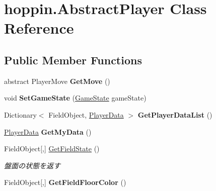 \hypertarget{classhoppin_1_1_abstract_player}{}\section{hoppin.\+Abstract\+Player Class Reference}
\label{classhoppin_1_1_abstract_player}
\subsection*{Public Member Functions}
\begin{DoxyCompactItemize}
\item 
abstract Player\+Move {\bfseries Get\+Move} ()\hypertarget{classhoppin_1_1_abstract_player_abd1e5ab01f3e4dfcb487432e19e28196}{}\label{classhoppin_1_1_abstract_player_abd1e5ab01f3e4dfcb487432e19e28196}

\item 
void {\bfseries Set\+Game\+State} (\hyperlink{classhoppin_1_1_game_system_1_1_game_state}{Game\+State} game\+State)\hypertarget{classhoppin_1_1_abstract_player_a832b3b3d17a2046d0a9c221684aabb36}{}\label{classhoppin_1_1_abstract_player_a832b3b3d17a2046d0a9c221684aabb36}

\item 
Dictionary$<$ Field\+Object, \hyperlink{classhoppin_1_1_game_system_1_1_player_data}{Player\+Data} $>$ {\bfseries Get\+Player\+Data\+List} ()\hypertarget{classhoppin_1_1_abstract_player_a5c27809c110d053e8a3e765350333bac}{}\label{classhoppin_1_1_abstract_player_a5c27809c110d053e8a3e765350333bac}

\item 
\hyperlink{classhoppin_1_1_game_system_1_1_player_data}{Player\+Data} {\bfseries Get\+My\+Data} ()\hypertarget{classhoppin_1_1_abstract_player_af95bb5c30ae4c8580fcc74931c7d074c}{}\label{classhoppin_1_1_abstract_player_af95bb5c30ae4c8580fcc74931c7d074c}

\item 
Field\+Object\mbox{[},\mbox{]} \hyperlink{classhoppin_1_1_abstract_player_a562595603775d7d3a86db952ab1803c4}{Get\+Field\+State} ()
\begin{DoxyCompactList}\small\item\em 盤面の状態を返す \end{DoxyCompactList}\item 
Field\+Object\mbox{[},\mbox{]} {\bfseries Get\+Field\+Floor\+Color} ()\hypertarget{classhoppin_1_1_abstract_player_ad9bfb34e15875e98b4a21ab185ec556e}{}\label{classhoppin_1_1_abstract_player_ad9bfb34e15875e98b4a21ab185ec556e}


\end{DoxyCompactItemize}
